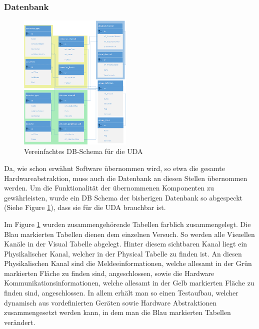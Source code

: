 \documentclass[10pt]{scrartcl}
\begin{document}
\subsubsection{Datenbank}
\begin{figure}
	\begin{center}
		\includegraphics[width=0.48\textwidth]{DBShemaEasy2.png}
		\caption{Vereinfachtes DB-Schema für die UDA}
		\label{fig:DBSchemaUDA}
	\end{center}
\end{figure}

Da, wie schon erwähnt Software übernommen wird, so etwa die gesamte Hardwareabstraktion, muss auch die Datenbank an diesen Stellen übernommen werden. Um die Funktionalität der übernommenen Komponenten zu gewährleisten, wurde ein DB Schema der bisherigen Datenbank so abgespeckt (Siehe Figure \ref{fig:DBSchemaUDA}), dass sie für die UDA brauchbar ist.


Im Figure \ref{fig:DBSchemaUDA} wurden zusammengehörende Tabellen farblich zusammengelegt. Die Blau markierten Tabellen dienen dem einzelnen Versuch. So werden alle Visuellen Kanäle in der Visual Tabelle abgelegt. Hinter diesem sichtbaren Kanal liegt ein Physikalischer Kanal, welcher in der Physical Tabelle zu finden ist. An diesen Physikalischen Kanal sind die Meldeeinformationen, welche allesamt in der Grün markierten Fläche zu finden sind, angeschlossen, sowie die Hardware Kommunikationsinformationen, welche allesamt in der Gelb markierten Fläche zu finden sind, angeschlossen. In allem erhält man so einen Testaufbau, welcher dynamisch aus vordefinierten Geräten sowie Hardware Abstraktionen zusammengesetzt werden kann, in dem man die Blau markierten Tabellen verändert.
\end{document}
